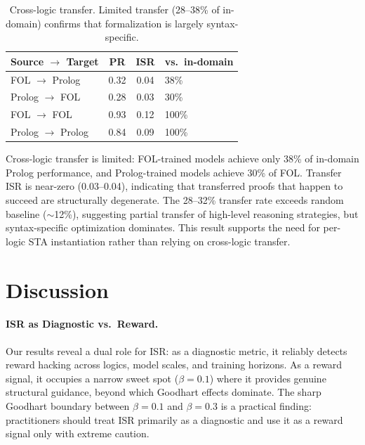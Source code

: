 \documentclass[11pt,twocolumn]{article}
\newcommand{\isr}{\textsc{ISR}}
\newcommand{\sta}{\textsc{STA}}
\newcommand{\pr}{\textsc{PR}}
\begin{document}
\begin{table}[h]
\centering
\caption{Cross-logic transfer. Limited transfer (28--38\% of in-domain) confirms that formalization is largely syntax-specific.}
\label{tab:transfer}
\small
\begin{tabular}{@{}lccl@{}}
\toprule
Source $\to$ Target & \pr{} & \isr{} & vs.\ in-domain \\
\midrule
FOL $\to$ Prolog & 0.32 & 0.04 & 38\% \\
Prolog $\to$ FOL & 0.28 & 0.03 & 30\% \\
FOL $\to$ FOL & 0.93 & 0.12 & 100\% \\
Prolog $\to$ Prolog & 0.84 & 0.09 & 100\% \\
\bottomrule
\end{tabular}
\end{table}

Cross-logic transfer is limited: FOL-trained models achieve only 38\% of in-domain Prolog performance, and Prolog-trained models achieve 30\% of FOL.
Transfer \isr{} is near-zero (0.03--0.04), indicating that transferred proofs that happen to succeed are structurally degenerate.
The 28--32\% transfer rate exceeds random baseline (${\sim}$12\%), suggesting partial transfer of high-level reasoning strategies, but syntax-specific optimization dominates.
This result supports the need for per-logic \sta{} instantiation rather than relying on cross-logic transfer.

\section{Discussion}
\label{sec:discussion}

\paragraph{ISR as Diagnostic vs.\ Reward.}
Our results reveal a dual role for \isr{}: as a diagnostic metric, it reliably detects reward hacking across logics, model scales, and training horizons.
As a reward signal, it occupies a narrow sweet spot ($\beta{=}0.1$) where it provides genuine structural guidance, beyond which Goodhart effects dominate.
The sharp Goodhart boundary between $\beta{=}0.1$ and $\beta{=}0.3$ is a practical finding: practitioners should treat \isr{} primarily as a diagnostic and use it as a reward signal only with extreme caution.
\end{document}
